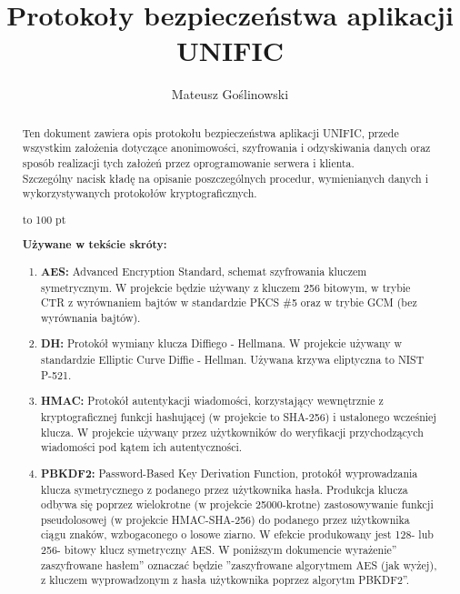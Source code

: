 \documentclass{article}
\begin{document}
\title{Protokoły bezpieczeństwa aplikacji UNIFIC}
\author{Mateusz Goślinowski}
\date{}
\maketitle
\clearpage



\begin{abstract}
Ten dokument zawiera opis protokołu bezpieczeństwa aplikacji UNIFIC, przede wszystkim
założenia dotyczące anonimowości, szyfrowania i odzyskiwania danych oraz sposób realizacji
tych założeń przez oprogramowanie serwera i klienta. \\

Szczególny nacisk kładę na opisanie poszczególnych procedur, wymienianych danych i wykorzystywanych
protokołów kryptograficznych.

\vbox to 100 pt{}

\begin{center}
\textbf{Używane w tekście skróty:}
\end{center}
\begin{enumerate}
\item \textbf{AES:} \quad Advanced Encryption Standard, schemat szyfrowania kluczem symetrycznym. W projekcie będzie używany
z kluczem 256 bitowym, w trybie CTR z wyrównaniem bajtów w standardzie PKCS \#5 oraz w trybie
GCM (bez wyrównania bajtów).

\item \textbf{DH:} \quad Protokół wymiany klucza Diffiego - Hellmana. W projekcie używany w standardzie Elliptic Curve Diffie - Hellman. Używana krzywa 
eliptyczna to NIST P-521.

\item \textbf{HMAC:} \quad Protokół autentykacji wiadomości, korzystający wewnętrznie z kryptograficznej funkcji hashującej
(w projekcie to SHA-256) i ustalonego wcześniej klucza. W projekcie używany przez użytkowników do weryfikacji przychodzących
wiadomości pod kątem ich autentyczności. 

\item \textbf{PBKDF2:} \quad Password-Based Key Derivation Function, protokół wyprowadzania klucza symetrycznego z podanego przez
użytkownika hasła. Produkcja klucza odbywa się poprzez wielokrotne (w projekcie 25000-krotne) zastosowywanie funkcji pseudolosowej
(w projekcie HMAC-SHA-256) do podanego przez użytkownika ciągu znaków, wzbogaconego o losowe ziarno. W efekcie produkowany
jest 128- lub 256- bitowy klucz symetryczny AES. W poniższym dokumencie wyrażenie'' zaszyfrowane hasłem'' oznaczać będzie ''zaszyfrowane
algorytmem AES (jak wyżej), z kluczem wyprowadzonym z hasła użytkownika poprzez algorytm PBKDF2''.  
\end{enumerate}
\end{abstract}
\end{document}
